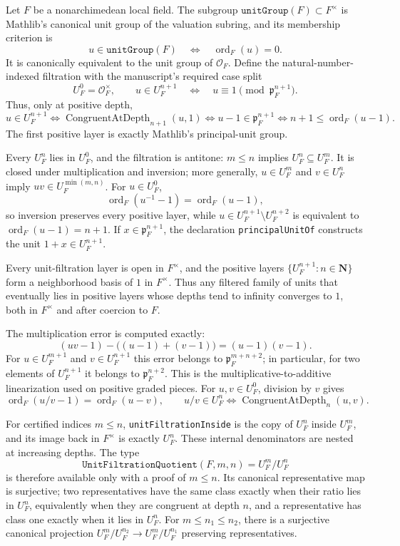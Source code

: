\begin{definition}\label{mod:localfield-unitfiltration}
Let $F$ be a nonarchimedean local field.  The subgroup
$\texttt{unitGroup}(F)\subset F^\times$ is Mathlib's canonical unit group of
the valuation subring, and its membership criterion is
\[
  u\in\texttt{unitGroup}(F)
  \quad\Longleftrightarrow\quad
  \operatorname{ord}_F(u)=0.
\]
It is canonically equivalent to the unit group of $\mathcal O_F$.  Define the
natural-number-indexed filtration with the manuscript's required case split
\[
 U_F^0=\mathcal O_F^\times,
 \qquad
 u\in U_F^{n+1}
 \quad\Longleftrightarrow\quad
 u\equiv 1\pmod{\mathfrak p_F^{n+1}}.
\]
Thus, only at positive depth,
\[
 u\in U_F^{n+1}
 \Longleftrightarrow
 \operatorname{CongruentAtDepth}_{n+1}(u,1)
 \Longleftrightarrow
 u-1\in\mathfrak p_F^{n+1}
 \Longleftrightarrow
 n+1\leq\operatorname{ord}_F(u-1).
\]
The first positive layer is exactly Mathlib's principal-unit group.

Every $U_F^n$ lies in $U_F^0$, and the filtration is antitone:
$m\leq n$ implies $U_F^n\subseteq U_F^m$.  It is closed under
multiplication and inversion; more generally, $u\in U_F^m$ and
$v\in U_F^n$ imply $uv\in U_F^{\min(m,n)}$.  For $u\in U_F^0$,
\[
 \operatorname{ord}_F(u^{-1}-1)=\operatorname{ord}_F(u-1),
\]
so inversion preserves every positive layer, while
$u\in U_F^{n+1}\setminus U_F^{n+2}$ is equivalent to
$\operatorname{ord}_F(u-1)=n+1$.  If
$x\in\mathfrak p_F^{n+1}$, the declaration \texttt{principalUnitOf}
constructs the unit $1+x\in U_F^{n+1}$.

Every unit-filtration layer is open in $F^\times$, and the positive layers
$\{U_F^{n+1}:n\in\mathbf N\}$ form a neighborhood basis of $1$ in
$F^\times$.  Thus any filtered family of units that eventually lies in
positive layers whose depths tend to infinity converges to $1$, both in
$F^\times$ and after coercion to $F$.

The multiplication error is computed exactly:
\[
 (uv-1)-\bigl((u-1)+(v-1)\bigr)=(u-1)(v-1).
\]
For $u\in U_F^{m+1}$ and $v\in U_F^{n+1}$ this error belongs to
$\mathfrak p_F^{m+n+2}$; in particular, for two elements of
$U_F^{n+1}$ it belongs to $\mathfrak p_F^{n+2}$.  This is the
multiplicative-to-additive linearization used on positive graded pieces.
For $u,v\in U_F^0$, division by $v$ gives
\[
 \operatorname{ord}_F(u/v-1)=\operatorname{ord}_F(u-v),
 \qquad
 u/v\in U_F^n
 \Longleftrightarrow
 \operatorname{CongruentAtDepth}_n(u,v).
\]

For certified indices $m\leq n$, \texttt{unitFiltrationInside} is the
copy of $U_F^n$ inside $U_F^m$, and its image back in $F^\times$ is exactly
$U_F^n$.  These internal denominators are nested at increasing depths.
The type
\[
 \texttt{UnitFiltrationQuotient}(F,m,n)=U_F^m/U_F^n
\]
is therefore available only with a proof of $m\leq n$.  Its canonical
representative map is surjective; two representatives have the same class
exactly when their ratio lies in $U_F^n$, equivalently when they are
congruent at depth $n$, and a representative has class one exactly when it
lies in $U_F^n$.  For $m\leq n_1\leq n_2$, there is a surjective canonical
projection $U_F^m/U_F^{n_2}\to U_F^m/U_F^{n_1}$ preserving representatives.


\end{definition}
